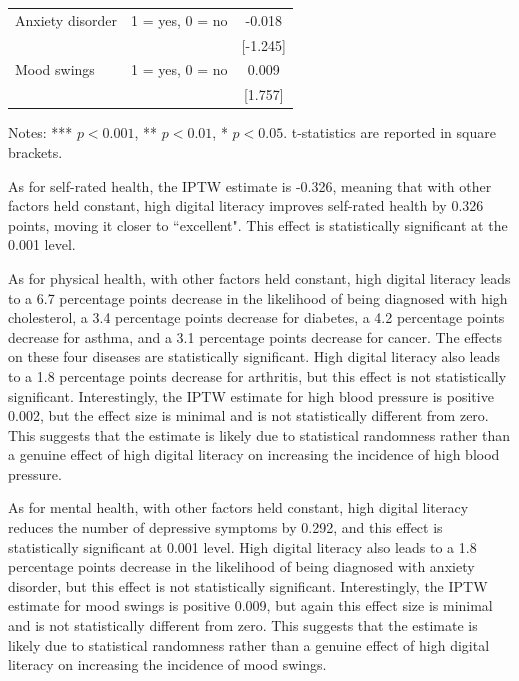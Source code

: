 \begin{table}[h!]
\begin{threeparttable}
\begin{tabular}{llc}
            Anxiety disorder & 1 = yes, 0 = no  & -0.018 \\
            &  & [-1.245] \\
            Mood swings & 1 = yes, 0 = no  & 0.009 \\
            &  & [1.757] \\
            \bottomrule
        \end{tabular}
        \begin{tablenotes}
            \footnotesize
            \item Notes: *** $p < 0.001$, ** $p < 0.01$, * $p < 0.05$. t-statistics are reported in square brackets.
        \end{tablenotes}
    \end{threeparttable}
\end{table}

As for self-rated health, the IPTW estimate is -0.326, meaning that with other factors held constant, high digital literacy improves self-rated health by 0.326 points, moving it closer to ``excellent". This effect is statistically significant at the 0.001 level.

As for physical health, with other factors held constant, high digital literacy leads to a 6.7 percentage points decrease in the likelihood of being diagnosed with high cholesterol, a 3.4 percentage points decrease for diabetes, a 4.2 percentage points decrease for asthma, and a 3.1 percentage points decrease for cancer. The effects on these four diseases are statistically significant. High digital literacy also leads to a 1.8 percentage points decrease for arthritis, but this effect is not statistically significant. Interestingly, the IPTW estimate for high blood pressure is positive 0.002, but the effect size is minimal and is not statistically different from zero. This suggests that the estimate is likely due to statistical randomness rather than a genuine effect of high digital literacy on increasing the incidence of high blood pressure.

As for mental health, with other factors held constant, high digital literacy reduces the number of depressive symptoms by 0.292, and this effect is statistically significant at 0.001 level. High digital literacy also leads to a 1.8 percentage points decrease in the likelihood of being diagnosed with anxiety disorder, but this effect is not statistically significant. Interestingly, the IPTW estimate for mood swings is positive 0.009, but again this effect size is minimal and is not statistically different from zero. This suggests that the estimate is likely due to statistical randomness rather than a genuine effect of high digital literacy on increasing the incidence of mood swings.

